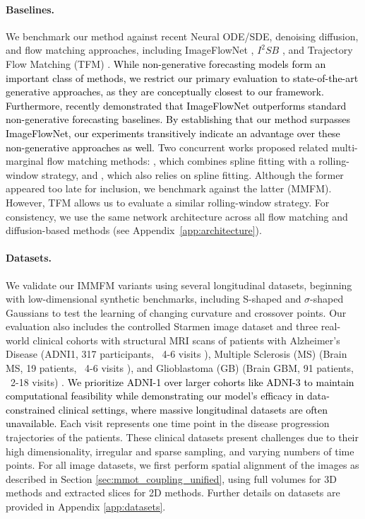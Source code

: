 \documentclass[twoside]{article}
\begin{document}
\paragraph{Baselines.}
We benchmark our method against recent Neural ODE/SDE, denoising diffusion, and flow matching approaches, including ImageFlowNet \citep{liu2025imageflownet}, $I^2SB$ \citep{liu20232}, and Trajectory Flow Matching (TFM) \citep{zhang2024trajectory}. \textcolor{black}{ While non-generative forecasting models form an important class of methods, we restrict our primary evaluation to state-of-the-art generative approaches, as they are conceptually closest to our framework. Furthermore, \citep{liu2025imageflownet} recently demonstrated that ImageFlowNet outperforms standard non-generative forecasting baselines. By establishing that our method surpasses ImageFlowNet, our experiments transitively indicate an advantage over these non-generative approaches as well.} Two concurrent works proposed related multi-marginal flow matching methods: \citep{lee2025multi}, which combines spline fitting with a rolling-window strategy, and \citep{rohbeckmodeling}, which also relies on spline fitting. Although the former appeared too late for inclusion, we benchmark against the latter (MMFM). However, TFM allows us to evaluate a similar rolling-window strategy. For consistency, we use the same network architecture across all flow matching and diffusion-based methods (see Appendix~\ref{app:architecture}).

\paragraph{Datasets.} We validate our IMMFM variants using several longitudinal datasets, beginning with low-dimensional synthetic benchmarks, including S-shaped and $\sigma$-shaped Gaussians to test the learning of changing curvature and crossover points. Our evaluation also includes the controlled Starmen image dataset \citep{Bone2018} and three real-world clinical cohorts with structural MRI scans of patients with Alzheimer's Disease (ADNI1, 317 participants, ~4-6 visits \citep{Mueller2005}), Multiple Sclerosis (MS) (Brain MS, 19 patients, ~4-6 visits \citep{Carass2017}), and Glioblastoma (GB) (Brain GBM, 91 patients, ~2-18 visits) \citep{Suter2022}. \textcolor{black}{We prioritize ADNI-1 over larger cohorts like ADNI-3 to maintain computational feasibility while demonstrating our model’s efficacy in data-constrained clinical settings, where massive longitudinal datasets are often unavailable.} Each visit represents one time point in the disease progression trajectories of the patients. These clinical datasets present challenges due to their high dimensionality, irregular and sparse sampling, and varying numbers of time points. For all image datasets, we first perform spatial alignment of the images as described in Section \ref{sec:mmot_coupling_unified}, using full volumes for 3D methods and extracted slices for 2D methods. Further details on datasets are provided in Appendix \ref{app:datasets}.
\end{document}
